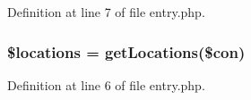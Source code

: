 Definition at line 7 of file entry.\+php.

\subsubsection[{\texorpdfstring{\$locations}{$locations}}]{\setlength{\rightskip}{0pt plus 5cm}\$locations = {\bf get\+Locations}(\$con)}\hypertarget{entry_8php_ad6ba91f5c932dec6e72487c45999806b}{}\label{entry_8php_ad6ba91f5c932dec6e72487c45999806b}


Definition at line 6 of file entry.\+php.

